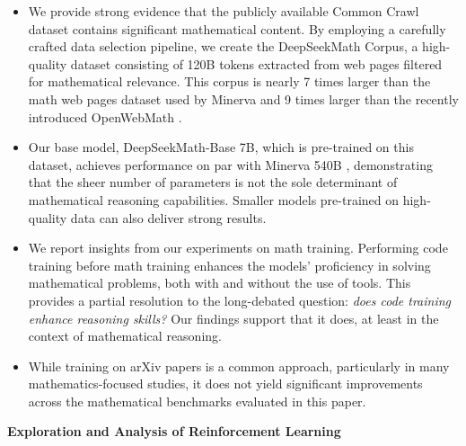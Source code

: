\begin{itemize}[topsep=0pt]
    \item We provide strong evidence that the publicly available Common Crawl dataset contains significant mathematical content. By employing a carefully crafted data selection pipeline, we create the DeepSeekMath Corpus, a high-quality dataset consisting of 120B tokens extracted from web pages filtered for mathematical relevance. This corpus is nearly 7 times larger than the math web pages dataset used by Minerva \citep{minerva} and 9 times larger than the recently introduced OpenWebMath \citep{openwebmath}.

    \item Our base model, DeepSeekMath-Base 7B, which is pre-trained on this dataset, achieves performance on par with Minerva 540B \citep{minerva}, demonstrating that the sheer number of parameters is not the sole determinant of mathematical reasoning capabilities. Smaller models pre-trained on high-quality data can also deliver strong results.

    \item We report insights from our experiments on math training. Performing code training before math training enhances the models’ proficiency in solving mathematical problems, both with and without the use of tools. This provides a partial resolution to the long-debated question: \textit{does code training enhance reasoning skills?} Our findings support that it does, at least in the context of mathematical reasoning.

    \item While training on arXiv papers is a common approach, particularly in many mathematics-focused studies, it does not yield significant improvements across the mathematical benchmarks evaluated in this paper.
\end{itemize}

\textbf{Exploration and Analysis of Reinforcement Learning}


